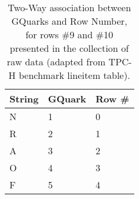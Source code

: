 \begin{table}[H]
\caption{Two-Way association between GQuarks and Row Number, for rows \#9 and \#10 presented in the collection of raw data (adapted from TPC-H benchmark lineitem table). }
\label{table:association_quarks_row}
\scriptsize
\centering
\begin{tabular}{ |  L{1.5cm} |  L{1.5cm}  |  L{1.5cm}  |    } 
\hline
String	&	GQuark	&	Row \#	  \\ \hline
\hline
N	&	1	&	0	  \\ \hline
R	&	2	&	1	  \\ \hline
A	&	3	&	2	  \\ \hline
O	&	4	&	3	  \\ \hline
F	&	5	&	4	  \\ \hline
\end{tabular}

\end{table}
